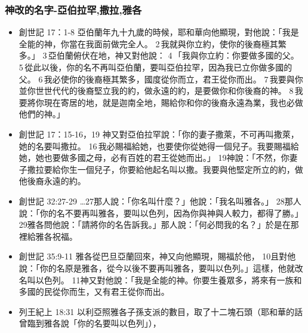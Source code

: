 \subsubsection{神改的名字-亞伯拉罕,撒拉,雅各}
\begin{itemize} 
\itemsep-.25em
\item 創世記 17：1-8
亞伯蘭年九十九歲的時候，耶和華向他顯現，對他說：「我是全能的神，你當在我面前做完全人。 2 我就與你立約，使你的後裔極其繁多。」 3 亞伯蘭俯伏在地，神又對他說： 4 「我與你立約：你要做多國的父。 5 從此以後，你的名不再叫亞伯蘭，要叫亞伯拉罕，因為我已立你做多國的父。 6 我必使你的後裔極其繁多，國度從你而立，君王從你而出。 7 我要與你並你世世代代的後裔堅立我的約，做永遠的約，是要做你和你後裔的神。 8 我要將你現在寄居的地，就是迦南全地，賜給你和你的後裔永遠為業，我也必做他們的神。」
\item 創世記 17：15-16，19
神又對亞伯拉罕說：「你的妻子撒萊，不可再叫撒萊，她的名要叫撒拉。 16 我必賜福給她，也要使你從她得一個兒子。我要賜福給她，她也要做多國之母，必有百姓的君王從她而出。」 19神說：「不然，你妻子撒拉要給你生一個兒子，你要給他起名叫以撒。我要與他堅定所立的約，做他後裔永遠的約。
\item 創世記 32:27-29
…27那人說：「你名叫什麼？」他說：「我名叫雅各。」 28那人說：「你的名不要再叫雅各，要叫以色列，因為你與神與人較力，都得了勝。」 29雅各問他說：「請將你的名告訴我。」那人說：「何必問我的名？」於是在那裡給雅各祝福。
\item 創世記 35:9-11
雅各從巴旦亞蘭回來，神又向他顯現，賜福於他， 10且對他說：「你的名原是雅各，從今以後不要再叫雅各，要叫以色列。」這樣，他就改名叫以色列。 11神又對他說：「我是全能的神。你要生養眾多，將來有一族和多國的民從你而生，又有君王從你而出。
\item 列王紀上 18:31
以利亞照雅各子孫支派的數目，取了十二塊石頭（耶和華的話曾臨到雅各說「你的名要叫以色列」），
\end{itemize} 

